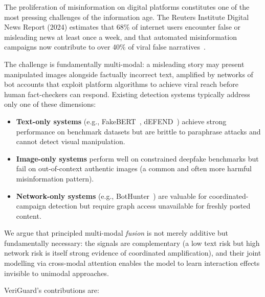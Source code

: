 \documentclass[11pt,a4paper]{article}
\begin{document}
The proliferation of misinformation on digital platforms constitutes one
of the most pressing challenges of the information age. The Reuters Institute
Digital News Report (2024) estimates that 68\% of internet users encounter
false or misleading news at least once a week, and that automated
misinformation campaigns now contribute to over 40\% of viral false
narratives~\cite{reuters2024}.

The challenge is fundamentally multi-modal: a misleading story may present
manipulated images alongside factually incorrect text, amplified by
networks of bot accounts that exploit platform algorithms to achieve viral
reach before human fact-checkers can respond. Existing detection systems
typically address only one of these dimensions:

\begin{itemize}
  \item \textbf{Text-only systems} (e.g., FakeBERT~\cite{fakebert2021},
    dEFEND~\cite{defend2019}) achieve strong performance on benchmark
    datasets but are brittle to paraphrase attacks and cannot detect
    visual manipulation.
  \item \textbf{Image-only systems} perform well on constrained deepfake
    benchmarks but fail on out-of-context authentic images (a common and
    often more harmful misinformation pattern).
  \item \textbf{Network-only systems} (e.g., BotHunter~\cite{bothunter2018})
    are valuable for coordinated-campaign detection but require graph
    access unavailable for freshly posted content.
\end{itemize}

We argue that principled multi-modal \emph{fusion} is not merely additive
but fundamentally necessary: the signals are complementary (a low text
risk but high network risk is itself strong evidence of coordinated
amplification), and their joint modelling via cross-modal attention
enables the model to learn interaction effects invisible to unimodal
approaches.

VeriGuard's contributions are:
\end{document}
